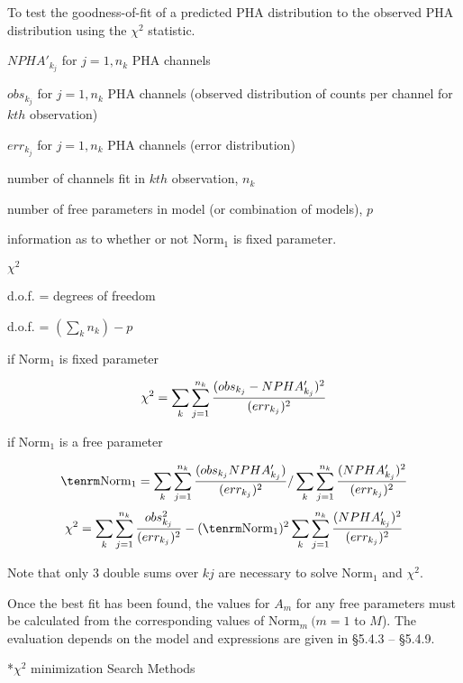 {\list 
 

To test the goodness-of-fit of a predicted PHA distribution to the
observed PHA distribution using the $\chi^{2}$ statistic.
 

$NPHA'_{k_j}$ for $j = 1, n_k$ PHA channels

$obs_{k_j}$ for $j = 1, n_k$ PHA channels (observed distribution of counts per
channel for $kth$ observation)

$err_{k_j}$ for $j = 1, n_k$ PHA channels (error distribution)

number of channels fit in $kth$ observation, $n_k$

number of free parameters in model (or combination of models), $p$

information as to whether or not Norm$_{1}$ is fixed parameter.
 
 
$\chi^{2}$

d.o.f. =  degrees of freedom


d.o.f. = $\left(\sum_k n_k \right) - p$

if Norm$_{1}$ is fixed parameter

}

$$\chi^{2} = \sum_k \sum_{j=1}^{n_k} {(obs_{k_j}-NPHA'_{k_j})^{2}\over (err_{k_j})^{2}}$$

{\list
 
if Norm$_{1}$ is a free parameter

}

$${\rm Norm}_{1} = \sum_k \sum_{j=1}^{n_k} {(obs_{k_j}NPHA'_{k_j})\over
(err_{k_j})^{2}}/ \sum_k \sum_{j=1}^{n_k} {(NPHA'_{k_j})^{2}\over (err_{k_j})^{2}}$$
$$\chi^{2} = \sum_k \sum_{j=1}^{n_k} {obs_{k_j}^{2}\over
(err_{k_j})^{2}} - ({\rm Norm}_{1})^{2}
\sum_k \sum_{j=1}^{n_k} {(NPHA'_{k_j})^{2}\over (err_{k_j})^{2}}$$

{\list

Note that only 3 double sums over $kj$ are necessary to solve Norm$_{1}$ and $\chi^{2}$.

Once the best fit has been found,
the values for $A_m$ for any free parameters must be calculated from
the
corresponding values of Norm$_m~ (m=1$ to $M$).
The evaluation depends on the model and expressions are given in
\S5.4.3 -- \S5.4.9.

}
 
\**$\chi^{2}$ minimization Search Methods

